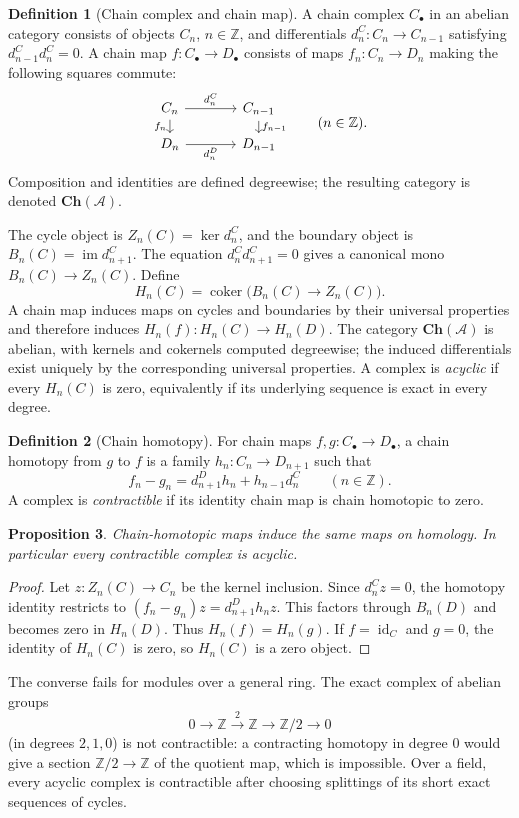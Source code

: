 \documentclass[11pt]{article}
\theoremstyle{definition}
\newtheorem{definition}{Definition}[section]
\theoremstyle{plain}
\newtheorem{proposition}[definition]{Proposition}
\newcommand{\A}{\mathcal A}
\newcommand{\id}{\operatorname{id}}
\newcommand{\im}{\operatorname{im}}
\newcommand{\coker}{\operatorname{coker}}
\newcommand{\Ch}{\mathbf{Ch}}
\begin{document}
\begin{definition}[Chain complex and chain map]
A chain complex $C_\bullet$ in an abelian category consists of objects $C_n$, $n\in\mathbb Z$, and differentials $d^C_n\colon C_n\to C_{n-1}$ satisfying $d^C_{n-1}d^C_n=0$. A chain map $f\colon C_\bullet\to D_\bullet$ consists of maps $f_n\colon C_n\to D_n$ making the following squares commute:
\[
\begin{tikzcd}[column sep=large,row sep=small]
C_n\arrow[r,"d^C_n"]\arrow[d,"f_n"']&C_{n-1}\arrow[d,"f_{n-1}"]\\
D_n\arrow[r,"d^D_n"']&D_{n-1}
\end{tikzcd}
\qquad(n\in\mathbb Z).
\]
Composition and identities are defined degreewise; the resulting category is denoted $\Ch(\A)$.
\end{definition}
The cycle object is $Z_n(C)=\ker d^C_n$, and the boundary object is $B_n(C)=\im d^C_{n+1}$. The equation $d^C_nd^C_{n+1}=0$ gives a canonical mono $B_n(C)\to Z_n(C)$. Define
\[
H_n(C)=\coker\bigl(B_n(C)\longrightarrow Z_n(C)\bigr).
\]
A chain map induces maps on cycles and boundaries by their universal properties and therefore induces $H_n(f)\colon H_n(C)\to H_n(D)$. The category $\Ch(\A)$ is abelian, with kernels and cokernels computed degreewise; the induced differentials exist uniquely by the corresponding universal properties. A complex is \emph{acyclic} if every $H_n(C)$ is zero, equivalently if its underlying sequence is exact in every degree.

\begin{definition}[Chain homotopy]
For chain maps $f,g\colon C_\bullet\to D_\bullet$, a chain homotopy from $g$ to $f$ is a family $h_n\colon C_n\to D_{n+1}$ such that
\[
f_n-g_n=d^D_{n+1}h_n+h_{n-1}d^C_n\qquad(n\in\mathbb Z).
\]
A complex is \emph{contractible} if its identity chain map is chain homotopic to zero.
\end{definition}
\begin{proposition}
Chain-homotopic maps induce the same maps on homology. In particular every contractible complex is acyclic.
\end{proposition}
\begin{proof}
Let $z\colon Z_n(C)\to C_n$ be the kernel inclusion. Since $d^C_nz=0$, the homotopy identity restricts to
$(f_n-g_n)z=d^D_{n+1}h_nz$. This factors through $B_n(D)$ and becomes zero in $H_n(D)$. Thus $H_n(f)=H_n(g)$. If $f=\id_C$ and $g=0$, the identity of $H_n(C)$ is zero, so $H_n(C)$ is a zero object.
\end{proof}
The converse fails for modules over a general ring. The exact complex of abelian groups
\[
0\longrightarrow\mathbb Z\xrightarrow{\;2\;}\mathbb Z
\longrightarrow\mathbb Z/2\longrightarrow0
\]
(in degrees $2,1,0$) is not contractible: a contracting homotopy in degree $0$ would give a section $\mathbb Z/2\to\mathbb Z$ of the quotient map, which is impossible. Over a field, every acyclic complex is contractible after choosing splittings of its short exact sequences of cycles.
\end{document}
